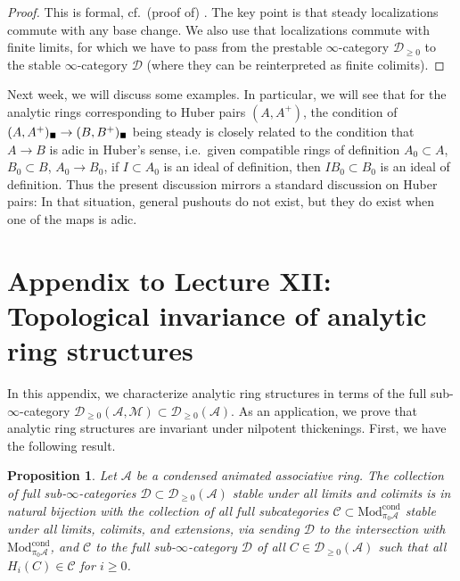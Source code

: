 \documentclass[11pt]{amsbook}
\newcommand{\solid}{{\mathsmaller{\blacksquare}}}
\newcommand{\CondMod}{\mathrm{Mod}^{\mathrm{cond}}}
\numberwithin{equation}{section}
\numberwithin{theorem}{section}
\newtheorem{proposition}[theorem]{Proposition}
\theoremstyle{definition}
\begin{document}
\begin{proof} This is formal, cf.~(proof of) \cite[Proposition 10.5]{Condensed}. The key point is that steady localizations commute with any base change. We also use that localizations commute with finite limits, for which we have to pass from the prestable $\infty$-category $\mathcal D_{\geq 0}$ to the stable $\infty$-category $\mathcal D$ (where they can be reinterpreted as finite colimits).
\end{proof}

Next week, we will discuss some examples. In particular, we will see that for the analytic rings corresponding to Huber pairs $(A,A^+)$, the condition of $(A,A^+)_\solid\to (B,B^+)_\solid$ being steady is closely related to the condition that $A\to B$ is adic in Huber's sense, i.e.~given compatible rings of definition $A_0\subset A$, $B_0\subset B$, $A_0\to B_0$, if $I\subset A_0$ is an ideal of definition, then $IB_0\subset B_0$ is an ideal of definition. Thus the present discussion mirrors a standard discussion on Huber pairs: In that situation, general pushouts do not exist, but they do exist when one of the maps is adic.

\newpage

\section*{Appendix to Lecture XII: Topological invariance of analytic ring structures}

In this appendix, we characterize analytic ring structures in terms of the full sub-$\infty$-category $\mathcal D_{\geq 0}(\mathcal A,\mathcal M)\subset \mathcal D_{\geq 0}(\mathcal A)$. As an application, we prove that analytic ring structures are invariant under nilpotent thickenings. First, we have the following result.

\begin{proposition}\label{prop:derivedvsabelian} Let $\mathcal A$ be a condensed animated associative ring. The collection of full sub-$\infty$-categories $\mathcal D\subset \mathcal D_{\geq 0}(\mathcal A)$ stable under all limits and colimits is in natural bijection with the collection of all full subcategories $\mathcal C\subset \CondMod_{\pi_0 \mathcal A}$ stable under all limits, colimits, and extensions, via sending $\mathcal D$ to the intersection with $\CondMod_{\pi_0\mathcal A}$, and $\mathcal C$ to the full sub-$\infty$-category $\mathcal D$ of all $C\in \mathcal D_{\geq 0}(\mathcal A)$ such that all $H_i(C)\in\mathcal C$ for $i\geq 0$.
\end{proposition}
\end{document}
